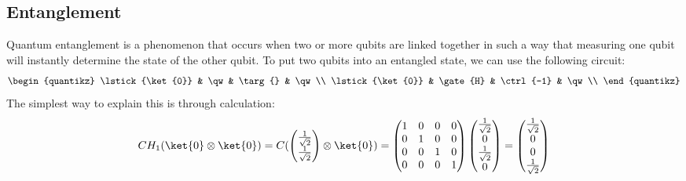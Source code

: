 \documentclass[a4paper, 11pt]{article}
\begin{document}
    \subsection{Entanglement} %
    Quantum entanglement is a phenomenon that occurs when two or more qubits are linked together in such a way that measuring one qubit will instantly determine the state of the other qubit.
    To put two qubits into an entangled state, we can use the following circuit:
    \begin{equation}
        \begin{quantikz}
            \lstick{\ket{0}} & \qw & \targ{} & \qw\\
            \lstick{\ket{0}} & \gate{H} & \ctrl{-1} & \qw\\
        \end{quantikz}
    \end{equation}The simplest way to explain this is through calculation:
    \begin{equation}
        C H_{1} (\ket{0} \otimes \ket{0}) =
        C (
        \begin{pmatrix}
            \frac{1}{\sqrt{2}} \\
            \frac{1}{\sqrt{2}} \\
        \end{pmatrix}
        \otimes
        \ket{0}
        ) = 
        \begin{pmatrix}
            1 & 0 & 0 & 0 \\
            0 & 1 & 0 & 0 \\
            0 & 0 & 1 & 0 \\
            0 & 0 & 0 & 1 \\
        \end{pmatrix}
        \begin{pmatrix}
            \frac{1}{\sqrt{2}} \\
            0 \\
            \frac{1}{\sqrt{2}} \\
            0 \\
        \end{pmatrix} =
        \begin{pmatrix}
            \frac{1}{\sqrt{2}} \\
            0 \\
            0 \\
            \frac{1}{\sqrt{2}} \\
        \end{pmatrix}
    \end{equation}
\end{document}
